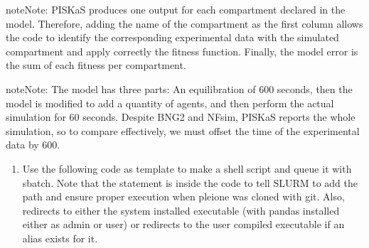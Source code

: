 \documentclass[letterpaper,10pt,english]{sphinxmanual}
\begin{document}
\begin{sphinxadmonition}{note}{Note:}
 PISKaS produces one output for each compartment
declared in the model. Therefore, adding the name of the compartment as the
first column allows the code to identify the corresponding experimental data
with the simulated compartment and apply correctly the fitness function.
Finally, the model error is the sum of each fitness per compartment.
\end{sphinxadmonition}

\begin{sphinxadmonition}{note}{Note:}
 The model has three parts: An equilibration of
600 seconds, then the model is modified to add a quantity of  agents,
and then perform the actual simulation for 60 seconds. Despite BNG2 and NFsim,
PISKaS reports the whole simulation, so to compare effectively, we must offset
the time of the experimental data by 600.
\end{sphinxadmonition}
\begin{enumerate}
\def\theenumi{\arabic{enumi}}
\def\labelenumi{\theenumi .}
\makeatletter\def\p@enumii{\p@enumi \theenumi .}\makeatother
\setcounter{enumi}{1}
\item {} 

Use the following code as template to make a shell script and queue it with
sbatch. Note that the  statement is inside the code to tell SLURM
to add the path and ensure proper execution when pleione was cloned with
git. Also,  redirects to either the system installed executable
(with pandas installed either as admin or user) or redirects to the user
compiled executable if an alias exists for it.

\end{enumerate}
\end{document}
